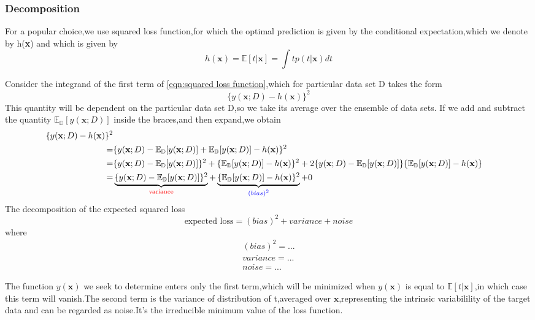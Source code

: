 \subsubsection{Decomposition}
For a popular choice,we use squared loss function,for which the optimal prediction is given by the conditional
expectation,which we denote by h(\textbf{x}) and which is given by 
\begin{equation}
h(\textbf{x}) = \mathbb{E}[t|\textbf{x}] = \int tp(t|\textbf{x})dt
\end{equation}

Consider the integrand of the first term of \ref{eqn:squared loss function},which for particular data set D takes the form
\begin{equation}
\{ y(\textbf{x};D) - h(\textbf{x}) \} ^2
\end{equation}
This quantity will be dependent on the particular data set D,so we take its average over the ensemble of data sets.
If we add and subtract the quantity $ \mathbb{E_D}[y(\textbf{x};D)] $ inside the braces,and then expand,we obtain
\begin{align}
\{ y(\textbf{x};D) - h(\textbf{x}) \} ^2 \\
=&\{y(\textbf{x};D) - \mathbb{E_D}[y(\textbf{x};D)] 
	+ \mathbb{E_D}[y(\textbf{x};D)] -h(\textbf{x})  \}^2         \\
=& \{ y(\textbf{x};D) -\mathbb{E}_{\mathbb{D}}[y(\textbf{x};D)]    \}^2 
	+ \{ \mathbb{E_D}[y(\textbf{x};D)] - h(\textbf{x})\}^2
	+ 2\{ y(\textbf{x};D) - \mathbb{E_D}[y(\textbf{x};D)]\}\{ \mathbb{E_D}[y(\textbf{x};D)] -h(\textbf{x})\} \\
=& \underbrace{\{ y(\textbf{x};D) -\mathbb{E}_{\mathbb{D}}[y(\textbf{x};D)]    \}^2}_\text{\color{red}{variance}} 
	+ \underbrace{\{ \mathbb{E_D}[y(\textbf{x};D)] - h(\textbf{x})\}^2}_\text{\color{blue}$(bias)^2$} 
	+0\\
\end{align}
The decomposition of the expected squared loss
\begin{equation}
\text{expected loss} = (bias)^2 + variance + noise
\end{equation}
where
\begin{eqnarray}
(bias)^2 = ... \\
variance = ... \\
noise = ...
\end{eqnarray}

The function $ y(\textbf{x}) $ we seek to determine enters only the first term,which will be minimized when $ y(\textbf{x}) $ is equal to $ \mathbb{E}[t|\textbf{x}] $,in which case this term will vanish.The second term is the variance of distribution of t,averaged over $ \textbf{x} $,representing the intrinsic variabilility of the target data and can be regarded as noise.It's the irreducible minimum value of the loss function.

